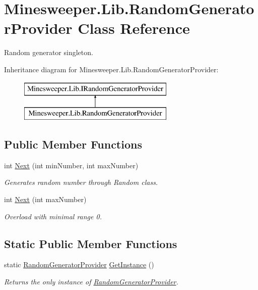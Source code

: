 \hypertarget{class_minesweeper_1_1_lib_1_1_random_generator_provider}{\section{Minesweeper.\+Lib.\+Random\+Generator\+Provider Class Reference}
\label{class_minesweeper_1_1_lib_1_1_random_generator_provider}
}


Random generator singleton.  


Inheritance diagram for Minesweeper.\+Lib.\+Random\+Generator\+Provider\+:\begin{figure}[H]
\begin{center}
\leavevmode
\includegraphics[height=2.000000cm]{class_minesweeper_1_1_lib_1_1_random_generator_provider}
\end{center}
\end{figure}
\subsection*{Public Member Functions}
\begin{DoxyCompactItemize}
\item 
int \hyperlink{class_minesweeper_1_1_lib_1_1_random_generator_provider_a53e1e507758a05548dd09e14c81af8d4}{Next} (int min\+Number, int max\+Number)
\begin{DoxyCompactList}\small\item\em Generates random number through Random class. \end{DoxyCompactList}\item 
int \hyperlink{class_minesweeper_1_1_lib_1_1_random_generator_provider_afabb9a038955a531abcb19cb0c6b77a3}{Next} (int max\+Number)
\begin{DoxyCompactList}\small\item\em Overload with minimal range 0. \end{DoxyCompactList}\end{DoxyCompactItemize}
\subsection*{Static Public Member Functions}
\begin{DoxyCompactItemize}
\item 
static \hyperlink{class_minesweeper_1_1_lib_1_1_random_generator_provider}{Random\+Generator\+Provider} \hyperlink{class_minesweeper_1_1_lib_1_1_random_generator_provider_ab8f03e8ad898e70caa96d13e80f750b4}{Get\+Instance} ()
\begin{DoxyCompactList}\small\item\em Returns the only instance of \hyperlink{class_minesweeper_1_1_lib_1_1_random_generator_provider}{Random\+Generator\+Provider}. \end{DoxyCompactList}\end{DoxyCompactItemize}


